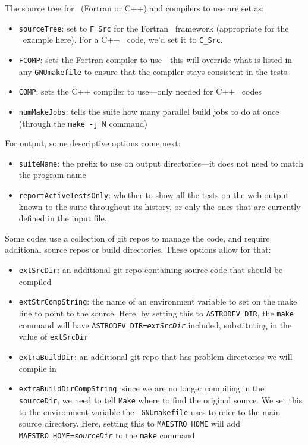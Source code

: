 The source tree for \boxlib\ (Fortran or C++) and compilers to use are set
as:
\begin{itemize}
\item {\tt sourceTree}: set to {\tt F\_Src} for the Fortran
  \boxlib\ framework (appropriate for the \maestro\ example here). For
  a C++ \boxlib\ code, we'd set it to {\tt C\_Src}.
\item {\tt FCOMP}: sets the Fortran compiler to use---this will
  override what is listed in any {\tt GNUmakefile} to ensure that the
  compiler stays consistent in the tests.
\item {\tt COMP}: sets the C++ compiler to use---only needed for C++
  \boxlib\ codes
\item {\tt numMakeJobs}: tells the suite how many parallel build
  jobs to do at once (through the {\tt make -j N} command)
\end{itemize}

For output, some descriptive options come next:
\begin{itemize}
\item {\tt suiteName}: the prefix to use on output directories---it
  does not need to match the program name
\item {\tt reportActiveTestsOnly}: whether to show all the tests on
  the web output known  to the suite throughout its history, or
  only the ones that are currently defined in the input file.
\end{itemize}

Some codes use a collection of git repos to manage the code, and
require additional source repos or build directories.  These
options allow for that:
\begin{itemize}
\item {\tt extSrcDir}: an additional git repo containing source code
  that should be compiled
\item {\tt extStrCompString}: the name of an environment variable to
  set on the make line to point to the source.  Here, by setting
  this to {\tt ASTRODEV\_DIR}, the {\tt make} command will have
  {\tt ASTRODEV\_DIR=\itshape{extSrcDir}} included, substituting
  in the value of {\tt extSrcDir}
\item {\tt extraBuildDir}: an additional git repo that has problem
  directories we will compile in
\item {\tt extraBuildDirCompString}: since we are no longer compiling
  in the {\tt sourceDir}, we need to tell {\tt Make} where to find the
  original source.  We set this to the environment variable the {\tt
    GNUmakefile} uses to refer to the main source directory.  Here,
  setting this to {\tt MAESTRO\_HOME} will add {\tt
    MAESTRO\_HOME=\itshape{sourceDir}} to the {\tt make} command
\end{itemize}

